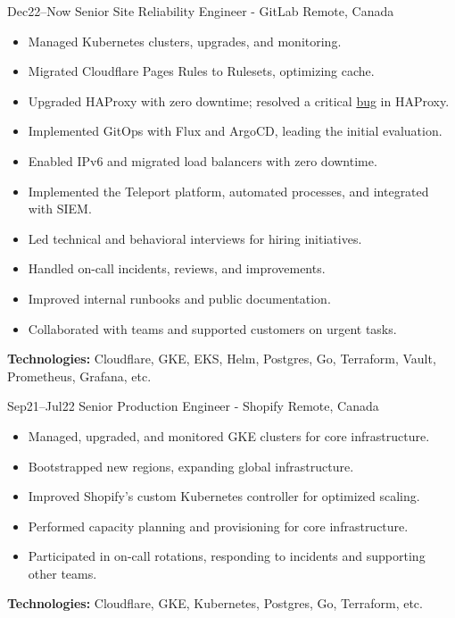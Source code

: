 \documentclass[]{cv-style}                     %
\begin{document}
\begin{entrylist}

  \entry
  {\small Dec22--Now}
  {Senior Site Reliability Engineer - GitLab}
  {Remote, Canada}
  {
    \begin{itemize}
      \item Managed Kubernetes clusters, upgrades, and monitoring.
      \item Migrated Cloudflare Pages Rules to Rulesets, optimizing cache.
      \item Upgraded HAProxy with zero downtime; resolved a critical \href{https://github.com/haproxy/haproxy/issues/2262}{bug} in HAProxy.
      \item Implemented GitOps with Flux and ArgoCD, leading the initial evaluation.
      \item Enabled IPv6 and migrated load balancers with zero downtime.
      \item Implemented the Teleport platform, automated processes, and integrated with SIEM.
      \item Led technical and behavioral interviews for hiring initiatives.
      \item Handled on-call incidents, reviews, and improvements.
      \item Improved internal runbooks and public documentation.
      \item Collaborated with teams and supported customers on urgent tasks.
    \end{itemize}
    \textbf{Technologies:} Cloudflare, GKE, EKS, Helm, Postgres, Go, Terraform, Vault, Prometheus, Grafana, etc.
  }

  \entry
  {\small Sep21--Jul22}
  {Senior Production Engineer - Shopify}
  {Remote, Canada}
  {
    \begin{itemize}
      \item Managed, upgraded, and monitored GKE clusters for core infrastructure.
      \item Bootstrapped new regions, expanding global infrastructure.
      \item Improved Shopify’s custom Kubernetes controller for optimized scaling.
      \item Performed capacity planning and provisioning for core infrastructure.
      \item Participated in on-call rotations, responding to incidents and supporting other teams.
    \end{itemize}
    \textbf{Technologies:} Cloudflare, GKE, Kubernetes, Postgres, Go, Terraform, etc.
  }


\end{entrylist}
\end{document}
